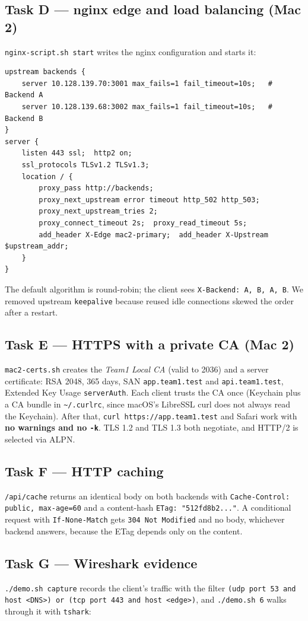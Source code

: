\documentclass[11pt,a4paper]{article}
\newcommand{\cmd}[1]{\texttt{#1}}
\begin{document}
\subsection{Task D --- nginx edge and load balancing (Mac 2)}
\cmd{nginx-script.sh start} writes the nginx configuration and starts it:
\begin{lstlisting}
upstream backends {
    server 10.128.139.70:3001 max_fails=1 fail_timeout=10s;   # Backend A
    server 10.128.139.68:3002 max_fails=1 fail_timeout=10s;   # Backend B
}
server {
    listen 443 ssl;  http2 on;
    ssl_protocols TLSv1.2 TLSv1.3;
    location / {
        proxy_pass http://backends;
        proxy_next_upstream error timeout http_502 http_503;
        proxy_next_upstream_tries 2;
        proxy_connect_timeout 2s;  proxy_read_timeout 5s;
        add_header X-Edge mac2-primary;  add_header X-Upstream $upstream_addr;
    }
}
\end{lstlisting}
The default algorithm is round-robin; the client sees
\cmd{X-Backend: A, B, A, B}. We removed upstream \cmd{keepalive} because
reused idle connections skewed the order after a restart.

\subsection{Task E --- HTTPS with a private CA (Mac 2)}
\cmd{mac2-certs.sh} creates the \emph{Team1 Local CA} (valid to 2036) and a
server certificate: RSA 2048, 365 days, SAN \cmd{app.team1.test} and
\cmd{api.team1.test}, Extended Key Usage \cmd{serverAuth}. Each client
trusts the CA once (Keychain plus a CA bundle in \cmd{\textasciitilde/.curlrc},
since macOS's LibreSSL curl does not always read the Keychain). After that,
\cmd{curl https://app.team1.test} and Safari work with \textbf{no warnings and
no \cmd{-k}}. TLS 1.2 and TLS 1.3 both negotiate, and HTTP/2 is selected via
ALPN.

\subsection{Task F --- HTTP caching}
\cmd{/api/cache} returns an identical body on both backends with
\cmd{Cache-Control: public, max-age=60} and a content-hash
\cmd{ETag: "512fd8b2..."}. A conditional request with
\cmd{If-None-Match} gets \cmd{304 Not Modified} and no body, whichever
backend answers, because the ETag depends only on the content.

\subsection{Task G --- Wireshark evidence}
\cmd{./demo.sh capture} records the client's traffic with the filter
\cmd{(udp port 53 and host <DNS>) or (tcp port 443 and host <edge>)}, and
\cmd{./demo.sh 6} walks through it with \cmd{tshark}:
\end{document}
